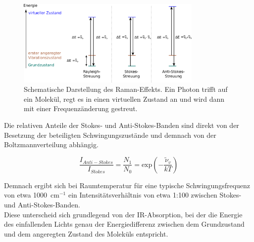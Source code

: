 \begin{figure}[H]
    \centering
    \includegraphics[width=0.8\textwidth]{1_Skript/Inkscape/Raman.png}
    \caption{Schematische Darstellung des Raman-Effekts. Ein Photon trifft auf ein Molekül, regt es in einen virtuellen Zustand an und wird dann mit einer Frequenzänderung gestreut.}
    \label{fig:Raman}
\end{figure}


Die relativen Anteile der Stokes- und Anti-Stokes-Banden sind direkt von der Besetzung der beteiligten Schwingungszustände und demnach von der Boltzmannverteilung abhängig.

\begin{equation}
    \frac{I_{Anti-Stokes}}{I_{Stokes}} = \frac{N_1}{N_0} = \text{exp}\left(-\frac{\tilde{\nu}_v}{kT}\right)
\end{equation}

Demnach ergibt sich bei Raumtemperatur für eine typische Schwingungsfrequenz von etwa 1000~cm$^{-1}$ ein Intensitätsverhältnis von etwa 1:100 zwischen Stokes- und Anti-Stokes-Banden.\\
Diese unterscheid sich grundlegend von der IR-Absorption, bei der die Energie des einfallenden Lichts genau der Energiedifferenz zwischen dem Grundzustand und dem angeregten Zustand des Moleküls entspricht.


